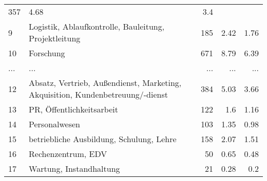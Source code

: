 \begin{longtable}{lXrrr}
          \num{357} &
          \num[round-mode=places,round-precision=2]{4,68} &
          \num[round-mode=places,round-precision=2]{3,4} \\
        9 & \multicolumn{1}{X}{Logistik, Ablaufkontrolle, Bauleitung, Projektleitung} & %
          \num{185} &
          \num[round-mode=places,round-precision=2]{2,42} &
          \num[round-mode=places,round-precision=2]{1,76} \\
        10 & \multicolumn{1}{X}{Forschung} & %
          \num{671} &
          \num[round-mode=places,round-precision=2]{8,79} &
          \num[round-mode=places,round-precision=2]{6,39} \\
       ... & ... & ... & ... & ... \\
        12 & \multicolumn{1}{X}{Absatz, Vertrieb, Außendienst, Marketing, Akquisition, Kundenbetreuung/-dienst} & %
          \num{384} &
          \num[round-mode=places,round-precision=2]{5,03} &
          \num[round-mode=places,round-precision=2]{3,66} \\

        13 & \multicolumn{1}{X}{PR, Öffentlichkeitsarbeit} & %
          \num{122} &
          \num[round-mode=places,round-precision=2]{1,6} &
          \num[round-mode=places,round-precision=2]{1,16} \\

        14 & \multicolumn{1}{X}{Personalwesen} & %
          \num{103} &
          \num[round-mode=places,round-precision=2]{1,35} &
          \num[round-mode=places,round-precision=2]{0,98} \\

        15 & \multicolumn{1}{X}{betriebliche Ausbildung, Schulung, Lehre} & %
          \num{158} &
          \num[round-mode=places,round-precision=2]{2,07} &
          \num[round-mode=places,round-precision=2]{1,51} \\

        16 & \multicolumn{1}{X}{Rechenzentrum, EDV} & %
          \num{50} &
          \num[round-mode=places,round-precision=2]{0,65} &
          \num[round-mode=places,round-precision=2]{0,48} \\

        17 & \multicolumn{1}{X}{Wartung, Instandhaltung} & %
          \num{21} &
          \num[round-mode=places,round-precision=2]{0,28} &
          \num[round-mode=places,round-precision=2]{0,2} \\


\end{longtable}
